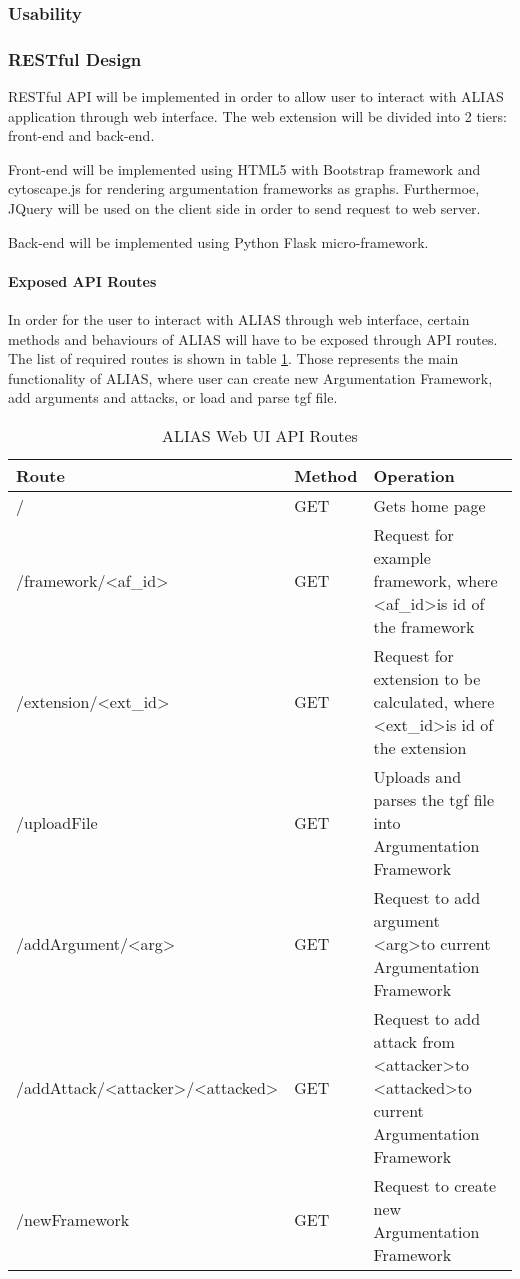 \subsubsection{Usability}


\subsubsection{RESTful Design}
RESTful API will be implemented in order to allow user to interact with ALIAS application through web interface. The web extension will be divided into 2 tiers: front-end and back-end. 

Front-end will be implemented using HTML5 with Bootstrap framework and cytoscape.js \citep{cytoscapejs} for rendering argumentation frameworks as graphs. Furthermoe, JQuery will be used on the client side in order to send request to web server.

Back-end will be implemented using Python Flask \citep{flaskDocs} micro-framework.

\paragraph{Exposed API Routes} 
In order for the user to interact with ALIAS through web interface, certain methods and behaviours of ALIAS will have to be exposed through API routes. The list of required routes is shown in table \ref{table:apiRoutes}. Those represents the main functionality of ALIAS, where user can create new Argumentation Framework, add arguments and attacks, or load and parse tgf file.


\begin{table}[]
	\centering
		\begin{tabular}{|p{7cm}|p{1.5cm}|p{4.5cm}|}
			\hline
			\textbf{Route} & \textbf{Method} & \textbf{Operation}  \\ \hline \hline
			/ & GET & Gets home page \\ \hline
			/framework/\textless{}af\_id\textgreater{} & GET & Request for example framework, where \textless{}af\_id\textgreater is id of the framework \\ \hline
			/extension/\textless{}ext\_id\textgreater{} & GET & Request for extension to be calculated, where \textless{}ext\_id\textgreater is id of the extension \\ \hline
			/uploadFile & GET & Uploads and parses the tgf file into Argumentation Framework \\ \hline
			/addArgument/\textless{}arg\textgreater{} & GET & Request to add argument \textless{}arg\textgreater to current Argumentation Framework \\ \hline
			/addAttack/\textless{}attacker\textgreater{}/\textless{}attacked\textgreater{} & GET & Request to add attack from \textless{}attacker\textgreater to \textless{}attacked\textgreater to current Argumentation Framework \\ \hline
			/newFramework & GET & Request to create new Argumentation Framework \\ \hline
		\end{tabular}%
	\caption{ALIAS Web UI API Routes}
	\label{table:apiRoutes}
\end{table}

